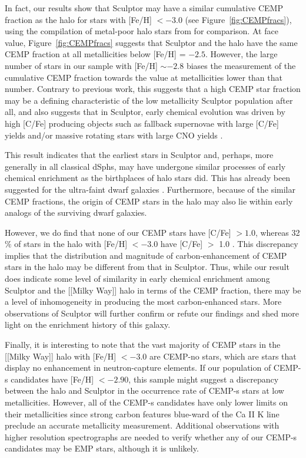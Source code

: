\documentclass{emulateapj-rtx4}
\begin{document}
In fact, our results show that Sculptor may have a similar cumulative CEMP fraction as the halo for 
stars with [Fe/H] $< -$3.0 (see Figure~\ref{fig:CEMPfracs}), using the compilation of metal-poor 
halo stars from \citet{pfb+14} for comparison. At face value, Figure~\ref{fig:CEMPfracs} suggests that Sculptor and the halo have the same CEMP fraction at all metallicities below [Fe/H] = $-2.5$. However, the large number of stars in our sample with [Fe/H] $\sim -2.8$ biases the measurement of the cumulative CEMP fraction towards the value at metallicities lower than that number.
Contrary to previous work, this suggests that a high CEMP star fraction may be a defining 
characteristic of the low metallicity Sculptor population after all, and also
suggests that in Sculptor, early chemical evolution was driven by high [C/Fe] 
producing objects such as fallback supernovae with large [C/Fe] yields and/or massive rotating stars with large 
CNO yields \citep{lcb+03, un+03, iut+05, h+07, mhe+10, hw+10, jab+10, tin+14}.

This result indicates that the earliest stars in Sculptor and, perhaps, more generally in all classical dSphs, may have undergone similar processes of early chemical enrichment as the birthplaces of halo stars did.  
This has  already been suggested for the ultra-faint dwarf galaxies \citep{fsg+10}. 
Furthermore, because of the similar CEMP fractions, the origin of CEMP stars in the halo may also lie within early analogs of the surviving dwarf galaxies.

However, we do find that none of our CEMP stars have [C/Fe] $> 1.0$, whereas 32$\%$ of stars in the halo with [Fe/H] $< -3.0$ have [C/Fe] $>$ 1.0 \citep{pfb+14}. 
This discrepancy implies that the distribution and magnitude of carbon-enhancement of CEMP stars in the halo may be different from that in Sculptor.
Thus, while our result does indicate some level of similarity in early chemical enrichment among Sculptor and the [[Milky Way]] halo in terms of the CEMP fraction, there may be a level of inhomogeneity in producing the most carbon-enhanced stars.
More observations of Sculptor will further confirm or refute our findings and shed more light on the enrichment history of this galaxy.
 

Finally, it is interesting to note that the vast majority of CEMP stars in the [[Milky Way]] halo with 
[Fe/H] $< -3.0$ are CEMP-no stars, which are stars that display no enhancement in neutron-capture elements.
If our population of CEMP-s candidates have [Fe/H] $< -2.90$, this sample might suggest a discrepancy between the halo and Sculptor in the occurrence rate of CEMP-s stars at low metallicities. However, all of the CEMP-s candidates have only lower limits on their metallicities since strong carbon features blue-ward of the Ca II K line preclude an accurate metallicity measurement. Additional observations with higher resolution spectrographs are needed to verify whether any of our CEMP-s candidates may be EMP stars, although it is unlikely.
\end{document}
